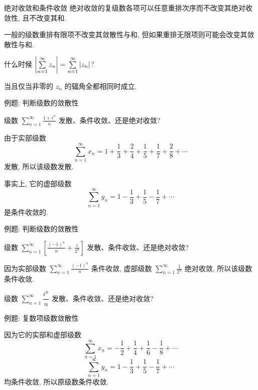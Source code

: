 \begin{frame}{绝对收敛和条件收敛}
\onslide<+->
绝对收敛的复级数各项可以任意重排次序而不改变其绝对收敛性, 且不改变其和.

\onslide<+->
一般的级数重排有限项不改变其敛散性与和, 但如果重排无限项则可能会改变其敛散性与和.
\begin{think}
什么时候 $\left|\sum\limits_{n=1}^\infty z_n\right|=\sum\limits_{n=1}^\infty|z_n|$?
\end{think}
\begin{answer}
当且仅当非零的 $z_n$ 的辐角全都相同时成立.
\end{answer}
\end{frame}


\begin{frame}{例题: 判断级数的敛散性}
\beqskip{3pt}
\begin{example}
级数 $\displaystyle\sum_{n=1}^\infty\frac{1+i^n}n$ 发散、条件收敛、还是绝对收敛?
\end{example}
\begin{solution}
由于实部级数
\[\sum_{n=1}^\infty x_n=
1+\frac13+\frac24+\frac15+\frac17+\frac28+\cdots\]
发散, 所以该级数发散.
\end{solution}
\onslide<+->
事实上, 它的虚部级数
\[\sum_{n=1}^\infty y_n=
1-\frac13+\frac15-\frac17+\cdots\]
是条件收敛的.
\endgroup
\end{frame}


\begin{frame}{例题: 判断级数的敛散性}
\begin{example}
级数 $\displaystyle\sum_{n=1}^\infty\left[\frac{(-1)^n}n+\frac i{2^n}\right]$ 发散、条件收敛、还是绝对收敛?
\end{example}
\begin{solution}
因为实部级数 $\displaystyle\sum_{n=1}^\infty\frac{(-1)^n}n$ 条件收敛,
\onslide<+->
虚部级数 $\displaystyle\sum_{n=1}^\infty\frac1{2^n}$ 绝对收敛,
\onslide<+->
所以该级数条件收敛.
\end{solution}
\begin{example}
级数 $\displaystyle\sum_{n=1}^\infty\dfrac{i^n}n$ 发散、条件收敛、还是绝对收敛?
\end{example}
\end{frame}



\begin{frame}{例题: 复数项级数敛散性}
\begin{solution}
因为它的实部和虚部级数
\[\sum_{n=1}^\infty x_n=-\frac12+\frac14+\frac16-\frac18+\cdots\]
\onslide<+->
\[\sum_{n=1}^\infty y_n=1-\frac13+\frac15-\frac17+\cdots\]
均条件收敛,
\onslide<+->
所以原级数条件收敛.
\end{solution}
\end{frame}


